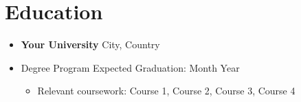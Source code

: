\section*{Education}
\begin{itemize}
    \item[] \textbf{Your University} \hfill City, Country
    \item[] Degree Program \hfill Expected Graduation: Month Year
    \begin{itemize}
        \item Relevant coursework: Course 1, Course 2, Course 3, Course 4
    \end{itemize}
\end{itemize}
\sectionspace 